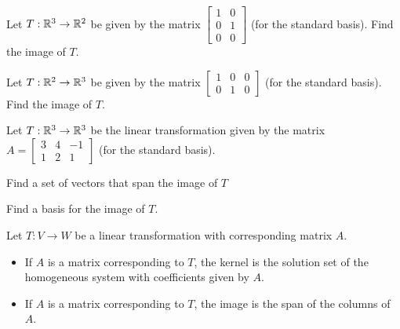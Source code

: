 \begin{applicationActivities}{2}{18}
\begin{activity}{5}
Let $T: \mathbb{R}^3 \rightarrow \mathbb{R}^2$ be given by the matrix $\begin{bmatrix} 1 & 0 \\ 0 & 1 \\ 0 & 0 \end{bmatrix}$ (for the standard basis).  Find the image of $T$.
\end{activity}

\begin{activity}{5}
Let $T: \mathbb{R}^2 \rightarrow \mathbb{R}^3$ be given by the matrix $\begin{bmatrix} 1 & 0 &0  \\ 0 & 1 & 0 \end{bmatrix}$ (for the standard basis).  Find the image of $T$.
\end{activity}


\begin{activity}{10}
Let $T: \mathbb{R}^3 \rightarrow \mathbb{R}^3$ be the linear transformation given by the matrix $A=\begin{bmatrix} 3 & 4 & -1 \\ 1 & 2 & 1 \end{bmatrix}$ (for the standard basis).
\begin{subactivity}
Find a set of vectors that span the image of $T$
\end{subactivity}
\begin{subactivity}
Find a basis for the image of $T$.
\end{subactivity}
\end{activity}

\begin{observation}
Let $T: V \rightarrow W$ be a linear transformation with corresponding matrix $A$.

\begin{itemize}
\item If $A$ is a matrix corresponding to $T$, the kernel is the solution set of the homogeneous system with coefficients given by $A$. 
\item If $A$ is a matrix corresponding to $T$, the image is the span of the columns of $A$.
\end{itemize}
\end{observation}

\end{applicationActivities}
